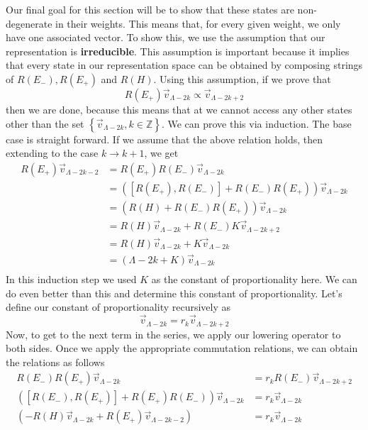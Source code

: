 Our final goal for this section will be to show 
that these states are non-degenerate in their weights. 
This means that, for every given weight, we only have one associated vector. 
To show this, we use the assumption that our representation is 
\textbf{irreducible}. This assumption is important because 
it implies that every state in our representation space 
can be obtained by composing strings of 
$ R ( E_- ) , R ( E _ + ) $ and  $ R (H ) $. 
Using this assumption, if we prove that 
\[
 R ( E_ + ) \vec{v} _{ \Lambda - 2k } \propto \vec{v} _{ \Lambda - 2k + 2 }
\] then we are done, because this means 
that at we cannot access any other states other 
than the set $ \left\{  \vec{v}_{ \Lambda - 2 k }, k \in \mathbb{ Z}  \right\} $. 
We can prove this via induction. 
The base case is straight forward. If we assume that 
the above relation holds, then extending to the case 
$k \to k + 1 $, we get 
\begin{align*}
	R ( E_ + ) \vec{v}_{ \Lambda - 2 k - 2 } &=  R ( E_ + ) R( E _-) \vec{v}_{ \Lambda - 2k } \\
						 &=  \left( [ R ( E_ + ) , R ( E _ - ) ] + R ( E_-) R( E_ + ) 
						 \right) \vec{v} _{ \Lambda - 2k } \\
						 &=  \left(   R( H ) + R ( E_ - ) R ( E _ + )  \right) \vec{v}
						 _{ \Lambda - 2k }\\
						 &=  R( H ) \vec{v} _{ \Lambda - 2k } 
						 + R ( E_ - ) K \vec{v}_{ \Lambda - 2k + 2 }\\
						 &=  R( H ) \vec{v}_{ \Lambda - 2k } + K \vec{v}_{ \Lambda - 2k } \\
						 &=  \left(  \Lambda - 2k   + K \right)  \vec{v}_{ \Lambda - 2k } \\ 
\end{align*}
In this induction step we used $ K $ as the constant 
of proportionality here. We can do even better than this 
and determine this constant of proportionality.
Let's define our constant of proportionality 
recursively as 
\[
 \vec{v}_{ \Lambda - 2k } = r_ k \vec{v}_{ \Lambda - 2k + 2 }
\] Now, to get to the next term in the series, 
we apply our lowering operator to both sides. Once
we apply the appropriate commutation relations, we can 
obtain the relations as follows 
\begin{align*}
	R ( E_- ) R( E_ + ) \vec{v}_{ \Lambda - 2k } &=  r_ k R ( E _- ) \vec{v} _{ \Lambda - 2k + 2} \\
	\left(  [ R ( E_- ) ,R ( E _ + ) ] + R ( E _ + ) R ( E _ - )  \right) 
	\vec{v}_{ \Lambda - 2k } &=  r_ k \vec{v}_{ \Lambda - 2k } \\
	\left( - R ( H ) \vec{v}_{ \Lambda - 2k } + R ( E _ + ) \vec{v}_{ \Lambda - 2k - 2} \right) &=  
	r_ k \vec{v}_{ \Lambda - 2k }\\  
\end{align*} 
